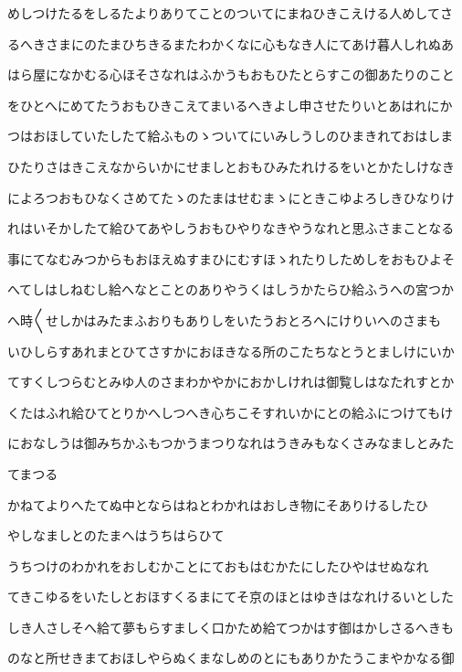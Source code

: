 \documentclass[a4paper,11pt,landscape]{ltjtarticle}
\begin{document}
めしつけたるをしるたよりありてことのついてにまねひきこえける人めしてさ
\par\medskip
るへきさまにのたまひちきるまたわかくなに心もなき人にてあけ暮人しれぬあ
\par\medskip
はら屋になかむる心ほそさなれはふかうもおもひたとらすこの御あたりのこと
\par\medskip
をひとへにめてたうおもひきこえてまいるへきよし申させたりいとあはれにか
\par\medskip
つはおほしていたしたて給ふものゝついてにいみしうしのひまきれておはしま
\par\medskip
ひたりさはきこえなからいかにせましとおもひみたれけるをいとかたしけなき
\par\medskip
によろつおもひなくさめてたゝのたまはせむまゝにときこゆよろしきひなりけ
\par\medskip
れはいそかしたて給ひてあやしうおもひやりなきやうなれと思ふさまことなる
\par\medskip
事にてなむみつからもおほえぬすまひにむすほゝれたりしためしをおもひよそ
\par\medskip
へてしはしねむし給へなとことのありやうくはしうかたらひ給ふうへの宮つか
\par\medskip
へ時〱せしかはみたまふおりもありしをいたうおとろへにけりいへのさまも
\par\medskip
いひしらすあれまとひてさすかにおほきなる所のこたちなとうとましけにいか
\par\medskip
てすくしつらむとみゆ人のさまわかやかにおかしけれは御覧しはなたれすとか
\par\medskip
くたはふれ給ひてとりかへしつへき心ちこそすれいかにとの給ふにつけてもけ
\par\medskip
におなしうは御みちかふもつかうまつりなれはうきみもなくさみなましとみた
\par\medskip
てまつる
\par\medskip
かねてよりへたてぬ中とならはねとわかれはおしき物にそありけるしたひ
\par\medskip
やしなましとのたまへはうちはらひて
\par\medskip
うちつけのわかれをおしむかことにておもはむかたにしたひやはせぬなれ
\par\medskip
てきこゆるをいたしとおほすくるまにてそ京のほとはゆきはなれけるいとした
\par\medskip
しき人さしそへ給て夢もらすましく口かため給てつかはす御はかしさるへきも
\par\medskip
のなと所せきまておほしやらぬくまなしめのとにもありかたうこまやかなる御
\par\medskip
\end{document}

